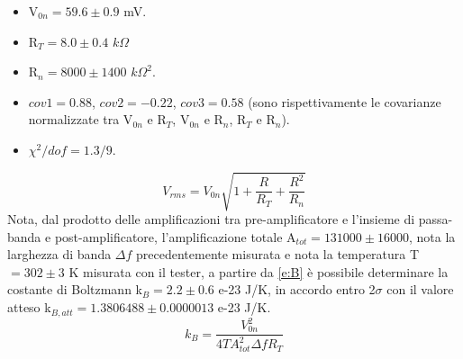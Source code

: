 \begin{itemize}
\item V$_{0n} = 59.6 \pm 0.9$ mV.
\item R$_T = 8.0 \pm 0.4$ $k\Omega$
\item R$_n = 8000 \pm 1400$ ${k\Omega}^2$.
\item $cov1 = 0.88$, $cov2 = -0.22$, $cov3 = 0.58$ (sono rispettivamente le covarianze normalizzate tra V$_{0n}$ e R$_T$, V$_{0n}$ e R$_n$, R$_T$ e R$_n$).
\item $\chi^2/dof = 1.3/9$.
\end{itemize}
\begin{equation}
V_{rms} = V_{0n} \sqrt{1+\frac{R}{R_T} + \frac{R^2}{R_n}}
\label{e:tot}
\end{equation}
Nota, dal prodotto delle amplificazioni tra pre-amplificatore e l'insieme di passa-banda e post-amplificatore, l'amplificazione totale A$_{tot} = 131000 \pm 16000$, nota la larghezza di banda $\Delta f$ precedentemente misurata e nota la temperatura T$ = 302 \pm 3$ K misurata con il tester, a partire da \ref{e:B} è possibile determinare la costante di Boltzmann k$_B = 2.2 \pm 0.6$ e-23 J/K, in accordo entro 2$\sigma$ con il valore atteso k$_{B,att} = 1.3806488 \pm 0.0000013$ e-23 J/K.
\begin{equation}
k_B = \frac{V_{0n}^2}{4 T {A_{tot}^2} \Delta f R_T}
\label{e:B}
\end{equation}

